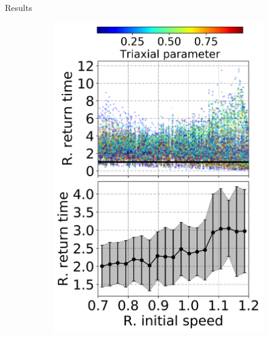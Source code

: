 \documentclass[handout]{beamer}
\begin{document}
\begin{frame}{Results}
	\begin{figure}[h]
		\centering
		\begin{subfigure}[b]{0.35\linewidth}
			\includegraphics[width = \linewidth]{"../Files/Week 14/relative_times_slides"}
		\end{subfigure}
		~ 
		\begin{subfigure}[b]{0.35\linewidth}

\end{subfigure}
\end{figure}
\end{frame}
\end{document}
